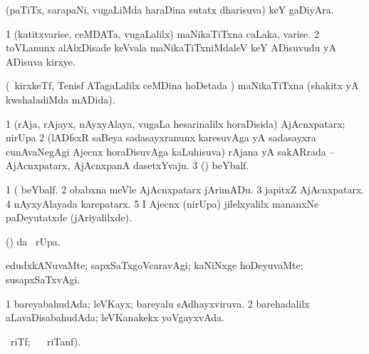 \bentry
{} 
\gl{\nA}
\expl{}
\bmng
(paTiTx, sarapaNi, \mo vugaLiMda haraDina sutatx dharisuva) keY gaDiyAra. 
\emng
\eentry

\bentry
{} 
\gl{\nA}
\expl{}
\bmng
\bnum
\num{1} (katitxvarise, ceMDATa, \mo vugaLalilx) maNikaTiTxna caLaka, varise. 
\num{2} toVLanunx alAlxDisade keVvala maNikaTiTxniMdaleV keY ADisuvudu yA ADisuva kirxye. 
\enum
\emng
\eentry

\bentry
{} 
\gl{\gu}
\expl{}
\bmng
(\kanmu\ kirxkeTf, Tenisf ATagaLalilx ceMDina hoDetada \vi) maNikaTiTxna (shakitx yA kwshaladiMda mADida). 
\emng
\eentry

\bentry 
{} 
\gl{\nA}
\expl{}
\bmng
\bnum
\num{1} (rAja, rAjayx, nAyxyAlaya, \mo vugaLa hesarinalilx horaDisida) AjAcnxpatarx; nirUpa 
\num{2} (lADfsxR saBeya sadasayxranunx karesuvAga yA sadasayxra cunAvaNegAgi Ajecnx horaDisuvAga kaLuhisuva) rAjana yA sakARrada -- AjAcnxpatarx, AjAcnxpanA dasetxYvaju. 
\num{3} (\viparx) beYbalf. 
\enum
\emng

\noindent
\gl{\pagu}
\expl{}
\bmng
\bnum
\num{1}  (  beYbalf. 
\num{2}  obabxna meVle AjAcnxpatarx jArimADu. 
\num{3}  japitxZ AjAcnxpatarx. 
\num{4}  nAyxyAlayada karepatarx. 
\num{5}  I Ajecnx (nirUpa) jilelxyalilx mananxNe paDeyutatxde (jAriyalilxde). 
\enum
\emng
\eentry

\bentry 
{} 
\gl{\kirx}
\expl{}
\bmng
(\pArxparx)  \kirx da \BUkaq\ rUpa. 
\emng

\noindent 
\gl{\pagu}
\expl{}
\bmng
{}  edudxkANuvaMte; sapxSaTxgoVcaravAgi; kaNiNxge hoDeyuvaMte; susapxSaTxvAgi. 
\emng
\eentry

\bentry
{} 
\gl{\gu}
\expl{}
\bmng
\bnum
\num{1} bareyabahudAda; leVKayx; bareyalu sAdhayxviruva. 
\num{2} barehadalilx aLavaDisabahudAda; leVKanakekx yoVgayxvAda. 
\enum
\emng
\eentry

\bentry
{} 
\gl{\kirx}
\ucAcx\ riTf; \BUkaq\   \ucAcx\ riTanf). 

